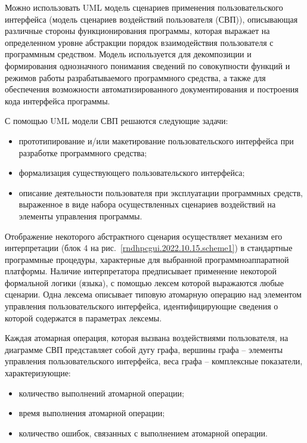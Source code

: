 Можно использовать UML модель сценариев применения пользовательского интерфейса (модель сценариев воздействий пользователя (СВП)), описывающая различные стороны функционирования программы, которая выражает на определенном уровне абстракции порядок взаимодействия пользователя с программным средством. Модель используется для декомпозиции и формирования однозначного понимания сведений по совокупности функций и режимов работы разрабатываемого программного средства, а также для обеспечения возможности автоматизированного документирования и построения кода интерфейса программы.

С помощью UML модели СВП решаются следующие задачи: 
\begin{itemize}
	\item прототипирование и/или макетирование пользовательского интерфейса при разработке программного средства;
	\item формализация существующего пользовательского интерфейса;
	\item описание деятельности пользователя при эксплуатации программных средств, выраженное в виде набора осуществленных сценариев воздействий на элементы управления программы.
\end{itemize}

Отображение некоторого абстрактного сценария осуществляет механизм его интерпретации (блок 4 на рис.~\ref{rndhpcgui.2022.10.15.scheme1}) в стандартные программные процедуры, характерные для выбранной программноаппаратной платформы. Наличие интерпретатора предписывает применение некоторой формальной логики (языка), с помощью лексем которой выражаются любые сценарии. Одна лексема описывает типовую атомарную операцию над элементом управления пользовательского интерфейса, идентифицирующие сведения о которой содержатся в параметрах лексемы.
	
Каждая атомарная операция, которая вызвана воздействиями пользователя, на диаграмме СВП представляет собой дугу графа, вершины графа -- элементы управления пользовательского интерфейса, веса графа -- комплексные показатели, характеризующие:
\begin{itemize}
	\item количество выполнений атомарной операции; 
	\item время выполнения атомарной операции;
	\item количество ошибок, связанных с выполнением атомарной операции.
\end{itemize}
\noteattributes{}

